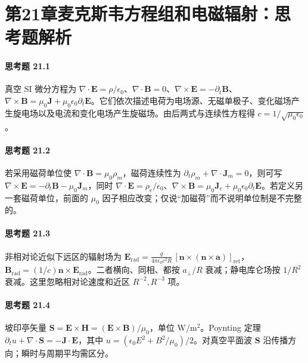 \section*{第21章\quad 麦克斯韦方程组和电磁辐射：思考题解析}
\paragraph{思考题 21.1}
真空 SI 微分方程为 \(\nabla\cdot\boldsymbol E=\rho/\epsilon_0\)、\(\nabla\cdot\boldsymbol B=0\)、\(\nabla\times\boldsymbol E=-\partial_t\boldsymbol B\)、\(\nabla\times\boldsymbol B=\mu_0\boldsymbol J+\mu_0\epsilon_0\partial_t\boldsymbol E\)。它们依次描述电荷为电场源、无磁单极子、变化磁场产生旋电场以及电流和变化电场产生旋磁场。由后两式与连续性方程得 \(c=1/\sqrt{\mu_0\epsilon_0}\)。

\paragraph{思考题 21.2}
若采用磁荷单位使 \(\nabla\cdot\boldsymbol B=\mu_0\rho_m\)，磁荷连续性为 \(\partial_t\rho_m+\nabla\cdot\boldsymbol J_m=0\)，则可写 \(\boxed{\nabla\times\boldsymbol E=-\partial_t\boldsymbol B-\mu_0\boldsymbol J_m}\)，同时 \(\nabla\cdot\boldsymbol E=\rho_e/\epsilon_0\)、\(\nabla\times\boldsymbol B=\mu_0\boldsymbol J_e+\mu_0\epsilon_0\partial_t\boldsymbol E\)。若定义另一套磁荷单位，前面的 \(\mu_0\) 因子相应改变；仅说“加磁荷”而不说明单位制是不完整的。

\paragraph{思考题 21.3}
非相对论近似下远区的辐射场为 \(\boxed{\boldsymbol E_{\mathrm{rad}}=\frac{q}{4\pi\epsilon_0 c^2R}\,[\boldsymbol n\times(\boldsymbol n\times\boldsymbol a)]_{\mathrm{ret}}}\)，\(\boldsymbol B_{\mathrm{rad}}=(1/c)\boldsymbol n\times\boldsymbol E_{\mathrm{rad}}\)。二者横向、同相、都按 \(a_\perp/R\) 衰减；静电库仑场按 \(1/R^2\) 衰减。这里忽略相对论速度和近区 \(R^{-2},R^{-3}\) 项。

\paragraph{思考题 21.4}
坡印亭矢量 \(\boxed{\boldsymbol S=\boldsymbol E\times\boldsymbol H=(\boldsymbol E\times\boldsymbol B)/\mu_0}\)，单位 \(\mathrm{W/m^2}\)。Poynting 定理 \(\partial_t u+\nabla\cdot\boldsymbol S=-\boldsymbol J\cdot\boldsymbol E\)，其中 \(u=(\epsilon_0 E^2+B^2/\mu_0)/2\)。对真空平面波 \(\boldsymbol S\) 沿传播方向；瞬时与周期平均需区分。

